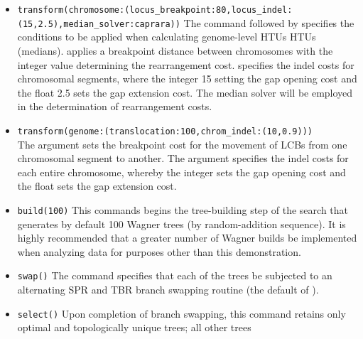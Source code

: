 \begin{itemize}
(\texttt{"genomeout"}) that can be read into Mauve to track the
movement of LCBs between sequences. Here, Mauve genome alignment
files will be generated with the names "genomeout\_i\_j.alignment''
where i and j are median states. Sequence ambiguities will not be
resolved to generate additional medians beyond those determined by
the data (\texttt{ignore\_polymorphism}). These files can be used
in conjunction with the  output to determine
inferred translocation and rearrangement events.  In the analysis
of unannotated chromosomes, the data {\bf must} be transformed to
 when using these Mauve aligners.  
\item \texttt{transform(chromosome:(locus\_breakpoint:80,locus\_indel:\\
(15,2.5),median\_solver:caprara))} The command  
followed by 
specifies the conditions to be applied when calculating genome-level
HTUs HTUs (medians).  applies a
breakpoint distance between chromosomes with the integer value
determining the rearrangement cost.  
specifies the indel costs for chromosomal segments, where the integer
15 setting the gap opening cost and the float 2.5 sets the gap
extension cost. The median solver  will be
employed in the determination of rearrangement costs.  
\item \texttt{transform(genome:(translocation:100,chrom\_indel:(10,0.9)))} \\
The argument  sets the breakpoint cost
for the movement of LCBs from one chromosomal segment to another.
The argument  specifies the indel costs
for each entire chromosome, whereby the integer sets the gap opening
cost and the float sets the gap extension cost.  
\item \texttt{build(100)} This commands begins the tree-building step of 
the search that generates by default 100 Wagner trees (by random-addition 
sequence). It is highly recommended that a greater number of Wagner builds be
implemented when analyzing data for purposes other than this
demonstration.  
\item \texttt{swap()} The  command
specifies that each of the trees be subjected to an alternating SPR
and TBR branch swapping routine (the default of \poy).  
\item \texttt{select()} Upon completion of branch swapping, this command
retains only optimal and topologically unique trees; all other trees

\end{itemize}
